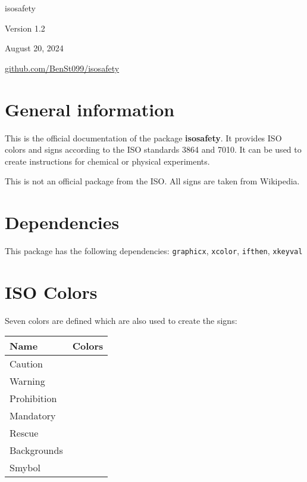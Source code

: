 \documentclass{article}
\begin{document}
\begin{center}
    {\Huge isosafety} \vspace{5mm}

    {\Large Version 1.2}\vspace{5mm}

    {\Large August 20, 2024}\vspace{5mm}

    \href{https://github.com/BenSt099/isosafety}{github.com/BenSt099/isosafety} 
\end{center}\vspace{5mm}

\section{General information}

This is the official documentation of the package \textbf{isosafety}. It provides ISO colors and signs according to the ISO standards
3864 and 7010. It can be used to create instructions for chemical or physical experiments.\vspace{5mm}


\noindent This is not an official package from the ISO. All signs are taken from Wikipedia.

\section{Dependencies}

This package has the following dependencies: \texttt{graphicx}, \texttt{xcolor}, \texttt{ifthen}, \texttt{xkeyval}

\section{ISO Colors}

Seven colors are defined which are also used to create the signs: \vspace{5mm}

\renewcommand{\arraystretch}{1.2}
    \begin{tabular}{ll}
        \hline
        Name & Colors \\ 
        \hline
        Caution & \cellcolor{Caution} \\
        Warning & \cellcolor{Warning} \\
        Prohibition & \cellcolor{Prohibition} \\
        Mandatory & \cellcolor{Mandatory} \\
        Rescue & \cellcolor{Rescue} \\
        Backgrounds & \cellcolor{Backgrounds} \\
        Smybol & \cellcolor{Symbol} \\
        \hline
\end{tabular}\vspace{5mm}
\end{document}
